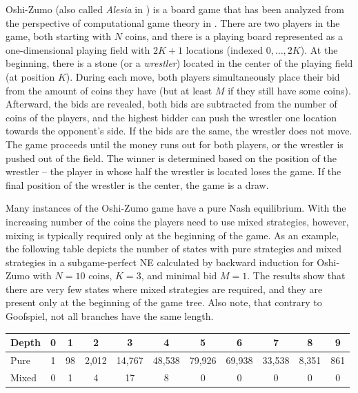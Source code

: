 Oshi-Zumo (also called {\it Alesia} in \cite{Perolat15Approximate}) is a board game that has been analyzed from the perspective of
computational game theory in \cite{buro2003}.
There are two players in the game, both starting with $N$ coins, and there is a playing board represented as a one-dimensional playing field with $2K+1$ locations (indexed $0, \ldots, 2K$).
At the beginning, there is a stone (or a \emph{wrestler}) located in the center of the playing field (\ie at position $K$).
During each move, both players simultaneously place their bid from the amount of coins they have (but at least $M$ if they still have some coins).
Afterward, the bids are revealed, both bids are subtracted from the number of coins of the players, and the highest bidder can push the wrestler one location towards the opponent's side.
If the bids are the same, the wrestler does not move.
The game proceeds until the money runs out for both players, or the wrestler is pushed out of the field.
The winner is determined based on the position of the wrestler -- the player in whose half the wrestler is located loses the game.
If the final position of the wrestler is the center, the game is a draw.

Many instances of the Oshi-Zumo game have a pure Nash equilibrium.
With the increasing number of the coins the players need to use mixed strategies, however, mixing is typically required only at the beginning of the game.
As an example, the following table depicts the number of states with pure strategies and mixed strategies in a subgame-perfect NE calculated by backward induction for Oshi-Zumo with $N=10$ coins, $K=3$, and minimal bid $M=1$. The results show that there are very few states where mixed strategies are required, and they are present only at the beginning of the game tree. Also note, that contrary to Goofspiel, not all branches have the same length.

\vspace{0.1cm}

\begin{center}
\small
\begin{tabular}{|l|c|c|c|c|c|c|c|c|c|c|}
\hline Depth & 0 & 1 & 2 & 3 & 4 & 5 & 6 & 7 & 8 & 9\\
\hline Pure  & 1 & 98 & 2,012 & 14,767 & 48,538 & 79,926 & 69,938 & 33,538 & 8,351 & 861\\
\hline Mixed & 0 &  1 &  4 &  17 & 8 & 0 & 0 & 0 & 0 & 0 \\
\hline
\end{tabular}
\end{center}

